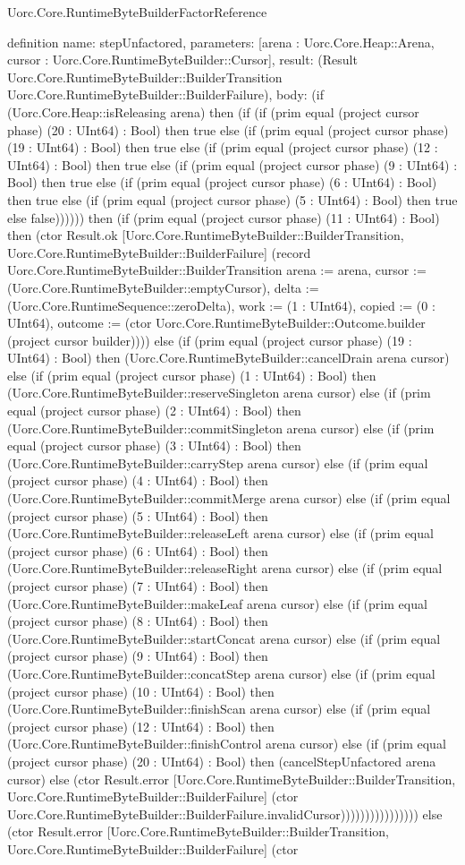 \begin{lexlean}{Uorc.Core.RuntimeByteBuilderFactorReference}
\begin{semanticmodule}
definition{
  name: stepUnfactored,
  parameters: [arena : Uorc.Core.Heap::Arena, cursor : Uorc.Core.RuntimeByteBuilder::Cursor],
  result: (Result Uorc.Core.RuntimeByteBuilder::BuilderTransition Uorc.Core.RuntimeByteBuilder::BuilderFailure),
  body: (if (Uorc.Core.Heap::isReleasing arena) then (if (if (prim equal (project cursor phase) (20 : UInt64) : Bool) then true else (if (prim equal (project cursor phase) (19 : UInt64) : Bool) then true else (if (prim equal (project cursor phase) (12 : UInt64) : Bool) then true else (if (prim equal (project cursor phase) (9 : UInt64) : Bool) then true else (if (prim equal (project cursor phase) (6 : UInt64) : Bool) then true else (if (prim equal (project cursor phase) (5 : UInt64) : Bool) then true else false)))))) then (if (prim equal (project cursor phase) (11 : UInt64) : Bool) then (ctor Result.ok [Uorc.Core.RuntimeByteBuilder::BuilderTransition, Uorc.Core.RuntimeByteBuilder::BuilderFailure] (record Uorc.Core.RuntimeByteBuilder::BuilderTransition {arena := arena, cursor := (Uorc.Core.RuntimeByteBuilder::emptyCursor), delta := (Uorc.Core.RuntimeSequence::zeroDelta), work := (1 : UInt64), copied := (0 : UInt64), outcome := (ctor Uorc.Core.RuntimeByteBuilder::Outcome.builder (project cursor builder))})) else (if (prim equal (project cursor phase) (19 : UInt64) : Bool) then (Uorc.Core.RuntimeByteBuilder::cancelDrain arena cursor) else (if (prim equal (project cursor phase) (1 : UInt64) : Bool) then (Uorc.Core.RuntimeByteBuilder::reserveSingleton arena cursor) else (if (prim equal (project cursor phase) (2 : UInt64) : Bool) then (Uorc.Core.RuntimeByteBuilder::commitSingleton arena cursor) else (if (prim equal (project cursor phase) (3 : UInt64) : Bool) then (Uorc.Core.RuntimeByteBuilder::carryStep arena cursor) else (if (prim equal (project cursor phase) (4 : UInt64) : Bool) then (Uorc.Core.RuntimeByteBuilder::commitMerge arena cursor) else (if (prim equal (project cursor phase) (5 : UInt64) : Bool) then (Uorc.Core.RuntimeByteBuilder::releaseLeft arena cursor) else (if (prim equal (project cursor phase) (6 : UInt64) : Bool) then (Uorc.Core.RuntimeByteBuilder::releaseRight arena cursor) else (if (prim equal (project cursor phase) (7 : UInt64) : Bool) then (Uorc.Core.RuntimeByteBuilder::makeLeaf arena cursor) else (if (prim equal (project cursor phase) (8 : UInt64) : Bool) then (Uorc.Core.RuntimeByteBuilder::startConcat arena cursor) else (if (prim equal (project cursor phase) (9 : UInt64) : Bool) then (Uorc.Core.RuntimeByteBuilder::concatStep arena cursor) else (if (prim equal (project cursor phase) (10 : UInt64) : Bool) then (Uorc.Core.RuntimeByteBuilder::finishScan arena cursor) else (if (prim equal (project cursor phase) (12 : UInt64) : Bool) then (Uorc.Core.RuntimeByteBuilder::finishControl arena cursor) else (if (prim equal (project cursor phase) (20 : UInt64) : Bool) then (cancelStepUnfactored arena cursor) else (ctor Result.error [Uorc.Core.RuntimeByteBuilder::BuilderTransition, Uorc.Core.RuntimeByteBuilder::BuilderFailure] (ctor Uorc.Core.RuntimeByteBuilder::BuilderFailure.invalidCursor)))))))))))))))) else (ctor Result.error [Uorc.Core.RuntimeByteBuilder::BuilderTransition, Uorc.Core.RuntimeByteBuilder::BuilderFailure] (ctor }
\end{semanticmodule}
\end{lexlean}
